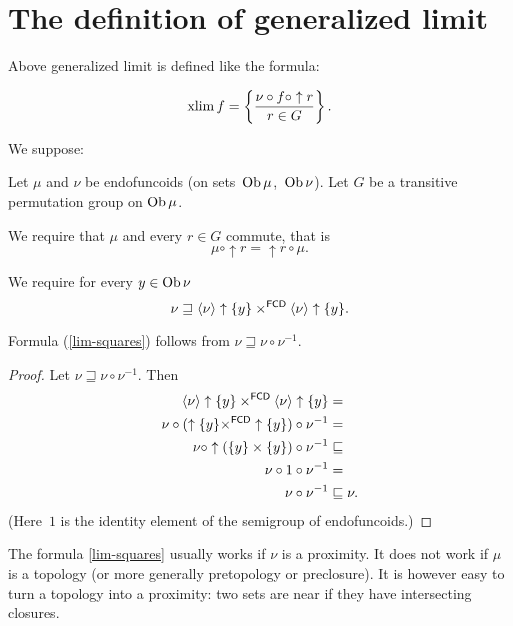 \section{The definition of generalized limit}

Above generalized limit is defined like the formula:

\begin{equation}\label{xlim1}
\operatorname{xlim} f = \left\{ \frac{ \nu\circ f\circ \uparrow r}{r\in G}\right\}.
\end{equation}

We suppose:

Let $\mu$ and $\nu$ be endofuncoids (on sets~$\operatorname{Ob}\mu$,~$\operatorname{Ob}\nu$). Let $G$ be a transitive permutation
group on $\operatorname{Ob}\mu$.

We require that $\mu$ and every $r\in G$ commute, that is
\begin{equation}\label{commute}
\mu\circ\uparrow r=\uparrow r\circ\mu.
\end{equation}

We require for every $y\in\operatorname{Ob}\nu$ 
\begin{equation}\label{lim-squares}
\nu\sqsupseteq\left\langle \nu\right\rangle\uparrow\{y\}\times^{\mathsf{FCD}}\left\langle \nu\right\rangle\uparrow\{y\}.
\end{equation}

\begin{prop}
Formula (\ref{lim-squares}) follows from $\nu\sqsupseteq\nu\circ\nu^{-1}$.
\end{prop}

\begin{proof}
Let $\nu\sqsupseteq\nu\circ\nu^{-1}$. Then
\begin{align*}
\left\langle \nu\right\rangle\uparrow\{y\}\times^{\mathsf{FCD}}\left\langle \nu\right\rangle\uparrow\{y\} & =\\
\nu\circ(\uparrow\{y\}\times^{\mathsf{FCD}}\uparrow\{y\})\circ\nu^{-1} & =\\
\nu\circ\uparrow(\{y\}\times\{y\})\circ\nu^{-1} & \sqsubseteq\\
\nu\circ 1\circ\nu^{-1} & =\\
\nu\circ\nu^{-1} & \sqsubseteq\nu.
\end{align*}
(Here~$1$ is the identity element of the semigroup of endofuncoids.)
\end{proof}

\begin{rem}
The formula \eqref{lim-squares} usually works if $\nu$ is a proximity.
It does not work if $\mu$ is a topology (or more generally pretopology or preclosure). It is however easy to turn a topology into a proximity: two sets are near if they have intersecting closures.
\end{rem}

